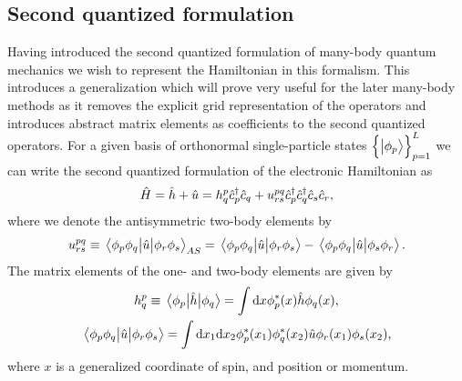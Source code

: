         \subsection{Second quantized formulation}
            Having introduced the second quantized formulation of many-body
            quantum mechanics we wish to represent the Hamiltonian in this
            formalism.
            This introduces a generalization which will prove very useful for
            the later many-body methods as it removes the explicit grid
            representation of the operators and introduces abstract matrix
            elements as coefficients to the second quantized operators.
            For a given basis of orthonormal single-particle states
            $\left\{ \ket{\phi_{p}} \right\}_{p = 1}^{L}$ we can write the second
            quantized formulation of the electronic Hamiltonian as
            \begin{align}
                \hat{H}
                =
                \hat{h}
                + \hat{u}
                =
                h^{p}_{q}
                \hat{c}_{p}^{\dagger}
                \hat{c}_{q}
                +
                u^{pq}_{rs}
                \hat{c}_{p}^{\dagger}
                \hat{c}_{q}^{\dagger}
                \hat{c}_{s}
                \hat{c}_{r},
                \label{eq:electronic-hamiltonian}
            \end{align}
            where we denote the antisymmetric two-body elements by
            \begin{align}
                u^{pq}_{rs}
                \equiv
                \mel{\phi_p\phi_q}{\hat{u}}{\phi_r\phi_s}_{AS}
                =
                \mel{\phi_p\phi_q}{\hat{u}}{\phi_r\phi_s}
                -
                \mel{\phi_p\phi_q}{\hat{u}}{\phi_s\phi_r}.
            \end{align}
            The matrix elements of the one- and two-body elements are given by
            \begin{gather}
                h^{p}_{q}
                \equiv
                \mel{\phi_{p}}{\hat{h}}{\phi_{q}}
                =
                \int\dd x\phi^{*}_{p}(x)\hat{h}\phi_q(x),
                \\
                \mel{\phi_p\phi_q}{\hat{u}}{\phi_r\phi_s}
                =
                \int\dd x_1\dd x_2
                \phi^{*}_p(x_1)
                \phi^{*}_q(x_2)
                \hat{u}
                \phi_{r}(x_1)
                \phi_{s}(x_2),
            \end{gather}
            where $x$ is a generalized coordinate of spin, and position or
            momentum.

